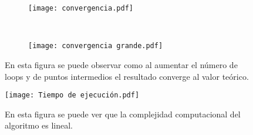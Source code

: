 \begin{figure*}[t!]
    \centering
    \begin{subfigure}[t]{0.5\textwidth}
        \centering
        \texttt{[image: convergencia.pdf]}
        \caption{}
        \label{fig:convergencia_loops}
    \end{subfigure}%
    ~ 
    \begin{subfigure}[t]{0.5\textwidth}
        \centering
        \texttt{[image: convergencia grande.pdf]}
        \caption{}
        \label{fig:convergencia_loops.derecha}
    \end{subfigure}
    \caption{En esta figura se puede observar como al aumentar el número de loops y de puntos intermedios el resultado converge al valor teórico.}
\label{fig:contorno}
\end{figure*}


\begin{figure}
    \centering
    \texttt{[image: Tiempo de ejecución.pdf]}
    \caption{En esta figura se puede ver que la complejidad computacional del algoritmo es lineal.}
    \label{fig:tiempo_de_ejecucion}
\end{figure}




\begin{comment}


\begin{figure}
    \centering
    \texttt{[image: convergencia.pdf]}
    \caption{En esta figura se puede observar como al aumentar el número de puntos por loops se reduce el error sistematico debido a la discretización de los loops.}
    \label{fig:convergencia_loops}
\end{figure}


\begin{table}
\begin{center}
 \begin{tabular}{|| c c c||} 
 \hline \\ 
 num. loops & N & $\frac{ \Delta F}{F}$ \\ [0.5ex] 
 \hline\hline
  10.000 & 10.000& 0.013 \\ 
 \hline
  1.000 & 10.000 & 0.024 \\
 \hline
  100 & 10.000 & 0.037\\
 \hline
  10.000 & 1.000 & 0.05 \\
 \hline
  1.000 & 1.000 & 0.058 \\ 
 \hline
   100 & 1.000 & 0.10 \\
 \hline
  10.000 & 1000 & 0.17\\
 \hline
  1.000 & 100 & 0.18 \\
 \hline
   100 & 100 & 0.20 \\ [1ex] 
 \hline
\end{tabular}
\end{center}
\caption{En esta tabla se puede ver como al aumentar el numero de loops y el número de puntos intermedios, el cálculo converge al resultado teórico.}
\label{table:1}
\end{table}
\end{comment}


